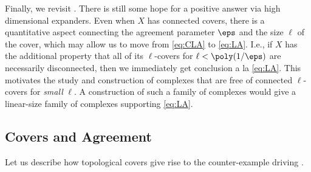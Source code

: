 \documentclass{article}[11pt]
\begin{document}
Finally, we revisit . There is still some hope for a positive answer via high dimensional expanders. Even when $X$ has connected covers,  there is a quantitative aspect connecting the agreement parameter $\eps$ and the size $\ell$ of the cover, which may allow us to move from \eqref{eq:CLA} to \eqref{eq:LA}. 
I.e., if $X$ has the additional property that all of its $\ell$-covers for $\ell < \poly(1/\eps)$ are necessarily disconnected, then we immediately get conclusion a la \eqref{eq:LA}. 
This motivates the study and construction of complexes that are free of connected $\ell$-covers for \emph{small} $\ell$.  A construction of such a family of complexes would give a linear-size family of complexes supporting \eqref{eq:LA}. %
\subsection*{Covers and Agreement} 
Let us describe how topological covers give rise to the counter-example driving . 
\end{document}

